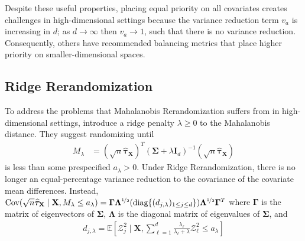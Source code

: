 \documentclass[11pt,twoside]{article}
\theoremstyle{definition}
\theoremstyle{remark}
\begin{document}
Despite these useful properties, placing equal priority on all covariates creates challenges in high-dimensional settings because the variance reduction term $v_a$ is increasing in $d$; as $d \to \infty$ then $v_a \to 1$, such that there is no variance reduction. Consequently, others have recommended balancing metrics that place higher priority on smaller-dimensional spaces.

\subsection{Ridge Rerandomization}

To address the problems that Mahalanobis Rerandomization suffers from in high-dimensional settings, \cite{branson2021ridge} introduce a ridge penalty $\lambda \geq 0$ to the Mahalanobis distance. They suggest randomizing until
\begin{align} \label{ridge_m}
    M_\lambda &= (\sqrt{n}\widehat{\bm{\tau}}_{\mathbf{X}})^T (\mathbf{\Sigma} + \lambda \mathbf{I}_d)^{-1} (\sqrt{n} \widehat{\bm{\tau}}_{\mathbf{X}}) 
\end{align}
is less than some prespecified $a_\lambda > 0$. Under Ridge Rerandomization, there is no longer an equal-percentage variance reduction to the covariance of the covariate mean differences. Instead, $\text{Cov}(\sqrt{n}\widehat{\bm{\tau}}_{\mathbf{X}} \mid \mathbf{X}, M_\lambda \leq a_\lambda ) = \mathbf{\Gamma} \mathbf{\Lambda}^{\nicefrac{1}{2}}( \text{diag}\{(d_{j, \lambda})_{1 \leq j \leq d} \}) \mathbf{\Lambda}^{\nicefrac{1}{2}} \mathbf{\Gamma}^T$ where $\mathbf{\Gamma}$ is the matrix of eigenvectors of $\mathbf{\Sigma}$, $\mathbf{\Lambda}$ is the diagonal matrix of eigenvalues of $\mathbf{\Sigma}$, and
\begin{align} \label{ridge_d}
    d_{j, \lambda} = \mathbb{E}\left[\mathcal{Z}^2_j \mid \mathbf{X}, \sum^d_{\ell=1} \frac{\lambda_\ell}{\lambda_\ell + \lambda} \mathcal{Z}^2_\ell \leq a_\lambda \right]
\end{align}
\end{document}
